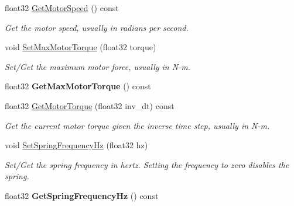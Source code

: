 \begin{DoxyCompactItemize}
float32 \mbox{\hyperlink{classb2WheelJoint_a47774ba5dfc1a6a5f15bcc651eea8127}{Get\+Motor\+Speed}} () const
\begin{DoxyCompactList}\small\item\em Get the motor speed, usually in radians per second. \end{DoxyCompactList}\item 
\mbox{\label{classb2WheelJoint_a8aae3cd624ec9d48fc86c325c4595edc}} 
void \mbox{\hyperlink{classb2WheelJoint_a8aae3cd624ec9d48fc86c325c4595edc}{Set\+Max\+Motor\+Torque}} (float32 torque)
\begin{DoxyCompactList}\small\item\em Set/\+Get the maximum motor force, usually in N-\/m. \end{DoxyCompactList}\item 
\mbox{\label{classb2WheelJoint_a8e7dc36e5c59760f2807886d0acd514e}} 
float32 {\bfseries Get\+Max\+Motor\+Torque} () const
\item 
\mbox{\label{classb2WheelJoint_a635497eba904925e06fd5316ddec4539}} 
float32 \mbox{\hyperlink{classb2WheelJoint_a635497eba904925e06fd5316ddec4539}{Get\+Motor\+Torque}} (float32 inv\+\_\+dt) const
\begin{DoxyCompactList}\small\item\em Get the current motor torque given the inverse time step, usually in N-\/m. \end{DoxyCompactList}\item 
\mbox{\label{classb2WheelJoint_af9f8fada5cb30f83aa2fbf486e9d347b}} 
void \mbox{\hyperlink{classb2WheelJoint_af9f8fada5cb30f83aa2fbf486e9d347b}{Set\+Spring\+Frequency\+Hz}} (float32 hz)
\begin{DoxyCompactList}\small\item\em Set/\+Get the spring frequency in hertz. Setting the frequency to zero disables the spring. \end{DoxyCompactList}\item 
\mbox{\label{classb2WheelJoint_a3a22add79f238b4243407956b031c9f4}} 
float32 {\bfseries Get\+Spring\+Frequency\+Hz} () const
\item 
\mbox{\label{classb2WheelJoint_a39b123ac045c8ec93faa65746e6655dc}} 

\end{DoxyCompactItemize}
